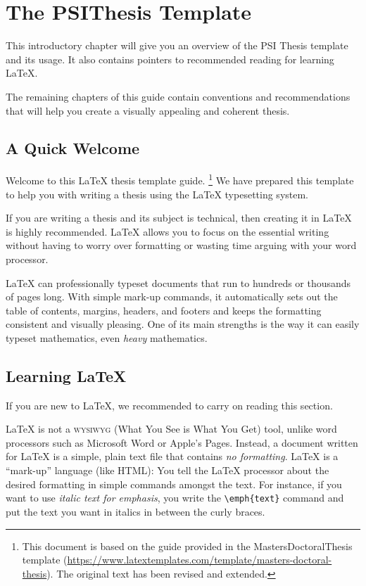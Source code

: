 \chapter{The PSIThesis Template} %

\label{Chapter1} %


This introductory chapter will give you an overview of the PSI Thesis template and its usage.
It also contains pointers to recommended reading for learning \LaTeX{}.

The remaining chapters of this guide contain conventions and recommendations that will help you create a visually appealing and coherent thesis.

\section{A Quick Welcome}

Welcome to this LaTeX thesis template guide.%
\footnote{This document is based on the guide provided in the MastersDoctoralThesis template (\url{https://www.latextemplates.com/template/masters-doctoral-thesis}). The original text has been revised and extended.}
We have prepared this template to help you with writing a thesis using the LaTeX typesetting system.

If you are writing a thesis and its subject is technical, then creating it in LaTeX is highly recommended. LaTeX allows you to focus on the essential writing without having to worry over formatting or wasting time arguing with your word processor.

LaTeX can professionally typeset documents that run to hundreds or thousands of pages long. With simple mark-up commands, it automatically sets out the table of contents, margins, headers, and footers and keeps the formatting consistent and visually pleasing. One of its main strengths is the way it can easily typeset mathematics, even \emph{heavy} mathematics.


\section{Learning LaTeX}

If you are new to LaTeX, we recommended to carry on reading this section.

LaTeX is not a \textsc{wysiwyg} (What You See is What You Get) tool, unlike word processors such as Microsoft Word or Apple's Pages. Instead, a document written for LaTeX is a simple, plain text file that contains \emph{no formatting}. LaTeX is a \enquote{mark-up} language (like HTML): You tell the LaTeX processor about the desired formatting in simple commands amongst the text. For instance, if you want to use \emph{italic text for emphasis}, you write the \verb|\emph{text}| command and put the text you want in italics in between the curly braces.


